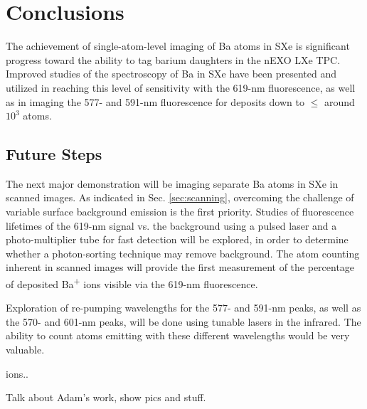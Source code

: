 \chapter{Conclusions}

The achievement of single-atom-level imaging of Ba atoms in SXe is significant progress toward the ability to tag barium daughters in the nEXO LXe TPC.  Improved studies of the spectroscopy of Ba in SXe have been presented and utilized in reaching this level of sensitivity with the 619-nm fluorescence, as well as in imaging the 577- and 591-nm fluorescence for deposits down to $\leq$ around $10^{3}$ atoms.



\section{Future Steps}
\label{sec:future}

The next major demonstration will be imaging separate Ba atoms in SXe in scanned images.  As indicated in Sec. \ref{sec:scanning}, overcoming the challenge of variable surface background emission is the first priority.  Studies of fluorescence lifetimes of the 619-nm signal vs. the background using a pulsed laser and a photo-multiplier tube for fast detection will be explored, in order to determine whether a photon-sorting technique may remove background.  The atom counting inherent in scanned images will provide the first measurement of the percentage of deposited Ba\textsuperscript{+} ions visible via the 619-nm fluorescence.

Exploration of re-pumping wavelengths for the 577- and 591-nm peaks, as well as the 570- and 601-nm peaks, will be done using tunable lasers in the infrared.  The ability to count atoms emitting with these different wavelengths would be very valuable.

ions..

Talk about Adam's work, show pics and stuff.